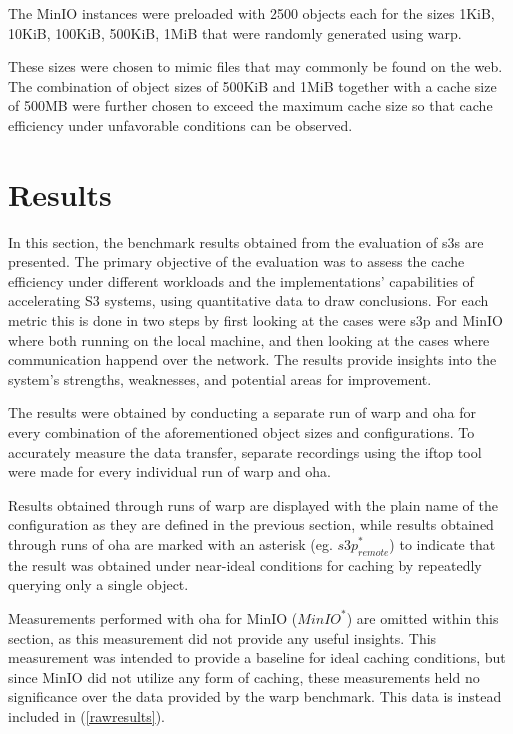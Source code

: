 The MinIO instances were preloaded with 2500 objects each for the sizes 1KiB, 10KiB, 100KiB, 500KiB, 1MiB that were randomly generated using warp.

These sizes were chosen to mimic files that may commonly be found on the web. The combination of object sizes of 500KiB and 1MiB together with a cache size of 500MB were further chosen to exceed the maximum cache size so that cache efficiency under unfavorable conditions can be observed.

\section{Results}

In this section, the benchmark results obtained from the evaluation of s3s are presented. The primary objective of the evaluation was to assess the cache efficiency under different workloads and the implementations' capabilities of accelerating S3 systems, using quantitative data to draw conclusions. For each metric this is done in two steps by first looking at the cases were s3p and MinIO where both running on the local machine, and then looking at the cases where communication happend over the network. The results provide insights into the system's strengths, weaknesses, and potential areas for improvement.

The results were obtained by conducting a separate run of warp and oha for every combination of the aforementioned object sizes and configurations. To accurately measure the data transfer, separate recordings using the iftop tool were made for every individual run of warp and oha.

Results obtained through runs of warp are displayed with the plain name of the configuration as they are defined in the previous section, while results obtained through runs of oha are marked with an asterisk (eg. ${s3p}^{*}_{remote}$) to indicate that the result was obtained under near-ideal conditions for caching by repeatedly querying only a single object.

Measurements performed with oha for MinIO (${MinIO}^{*}$) are omitted within this section, as this measurement did not provide any useful insights. This measurement was intended to provide a baseline for ideal caching conditions, but since MinIO did not utilize any form of caching, these measurements held no significance over the data provided by the warp benchmark. This data is instead included in (\ref{rawresults}).


